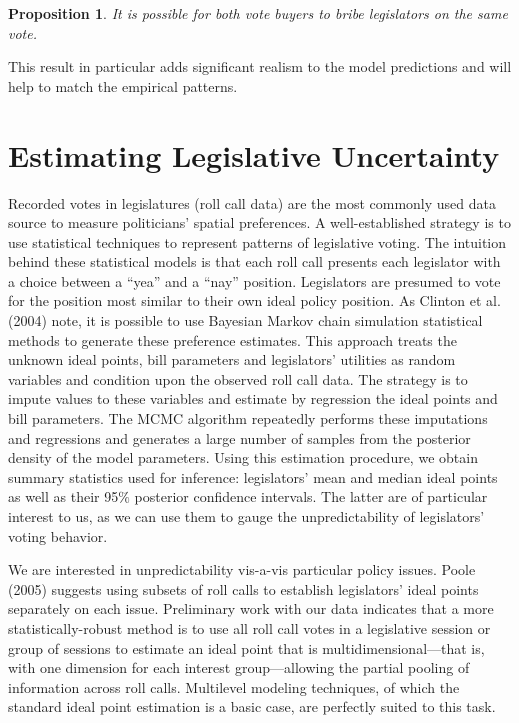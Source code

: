 \documentclass[12pt]{article}
\newtheorem{proposition}{Proposition}
\begin{document}
\begin{proposition}
  It is possible for both vote buyers to bribe legislators on the same vote.
	\label{res:bothbribe}
\end{proposition}

This result in particular adds significant realism to the model predictions and will help to match the empirical patterns.
		
		
\section{Estimating Legislative Uncertainty}
\label{sec:est}

Recorded votes in legislatures (roll call data) are the most commonly used data source to measure politicians' spatial preferences. A well-established strategy is to use statistical techniques to represent patterns of legislative voting. The intuition behind these statistical models is that each roll call presents each legislator with a choice between a ``yea'' and a ``nay'' position. Legislators are presumed to vote for the position most similar to their own ideal policy position. As Clinton et al. (2004) note, it is possible to use Bayesian Markov chain simulation statistical methods to generate these preference estimates. This approach treats the unknown ideal points, bill parameters and legislators' utilities as random variables and condition upon the observed roll call data. The strategy is to impute values to these variables and estimate by regression the ideal points and bill parameters. The MCMC algorithm repeatedly performs these imputations and regressions and generates a large number of samples from the posterior density of the model parameters. Using this estimation procedure, we obtain summary statistics used for inference: legislators' mean and median ideal points as well as their 95$\%$ posterior confidence intervals. The latter are of particular interest to us, as we can use them to gauge the unpredictability of  legislators' voting behavior.

We are interested in unpredictability vis-a-vis particular policy issues. Poole (2005) suggests using subsets of roll calls to establish legislators' ideal points separately on each issue. Preliminary work with our data indicates that a more statistically-robust method is to use all roll call votes in a legislative session or group of sessions to estimate an ideal point that is multidimensional---that is, with one dimension for each interest group---allowing the partial pooling of information across roll calls. Multilevel modeling techniques, of which the standard ideal point estimation is a basic case, are perfectly suited to this task.
\end{document}
